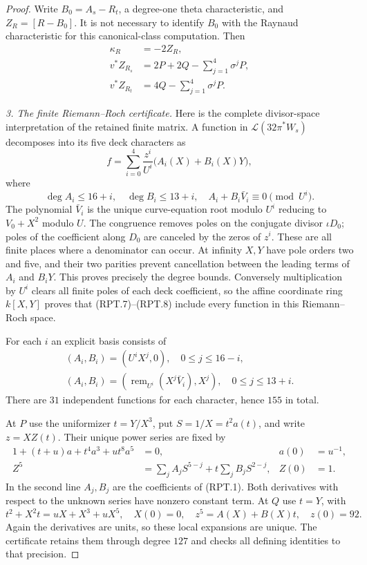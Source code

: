 \documentclass[11pt,a4paper]{article}
\begin{document}
\begin{proof}
Write $B_0=A_s-R_t$, a degree-one theta characteristic, and
$Z_R=[R-B_0]$. It is not necessary to identify $B_0$ with the
Raynaud characteristic for this canonical-class computation.
Then
\[
 \begin{aligned}
 \kappa_R&=-2Z_R,\\
 v^*Z_{R_s}&=2P+2Q-\sum_{j=1}^4\sigma^jP,\\
 v^*Z_{R_t}&=4Q-\sum_{j=1}^4\sigma^jP.
 \end{aligned}
 \tag{RPT.6}
\]

\emph{3. The finite Riemann--Roch certificate.}
Here is the complete divisor-space interpretation of the
retained finite matrix. A function in
$\mathcal L(32\pi^*W_s)$ decomposes into its five deck
characters as
\[
           f=\sum_{i=0}^4\frac{z^i}{U^i}
                              \bigl(A_i(X)+B_i(X)Y\bigr),
 \tag{RPT.7}
\]
where
\[
 \deg A_i\le16+i,\quad \deg B_i\le13+i,\quad
 A_i+B_i\bar V_i\equiv0\pmod{U^i}.
 \tag{RPT.8}
\]
The polynomial $\bar V_i$ is the unique curve-equation root
modulo $U^i$ reducing to $V_0+X^2$ modulo $U$.
The congruence removes poles on the conjugate divisor
$\iota D_0$; poles of the coefficient along $D_0$ are canceled
by the zeros of $z^i$. These are all finite places where a
denominator can occur. At infinity $X,Y$ have pole orders two
and five, and their two parities prevent cancellation between
the leading terms of $A_i$ and $B_iY$. This proves precisely
the degree bounds. Conversely multiplication by $U^i$ clears
all finite poles of each deck coefficient, so the affine
coordinate ring $k[X,Y]$ proves that (RPT.7)--(RPT.8) include
every function in this Riemann--Roch space.

For each $i$ an explicit basis consists of
\[
 \begin{gathered}
 (A_i,B_i)=(U^iX^j,0),\quad 0\le j\le16-i,\\
 (A_i,B_i)=
   (\operatorname{rem}_{U^i}(X^j\bar V_i),X^j),
                         \quad0\le j\le13+i.
 \end{gathered}
 \tag{RPT.9}
\]
There are $31$ independent functions for each character,
hence $155$ in total.

At $P$ use the uniformizer $t=Y/X^3$, put $S=1/X=t^2a(t)$,
and write $z=XZ(t)$. Their unique power series are fixed by
\[
 \begin{aligned}
 1+(t+u)a+t^4a^3+ut^8a^5&=0, & a(0)&=u^{-1},\\
 Z^5&=\sum_j A_jS^{5-j}
                   +t\sum_j B_jS^{2-j}, & Z(0)&=1.
 \end{aligned}
 \tag{RPT.10}
\]
In the second line $A_j,B_j$ are the coefficients of (RPT.1).
Both derivatives with respect to the unknown series have
nonzero constant term. At $Q$ use $t=Y$, with
\[
 t^2+X^2t=uX+X^3+uX^5,\quad X(0)=0,\quad
 z^5=A(X)+B(X)t,\quad z(0)=92.
 \tag{RPT.11}
\]
Again the derivatives are units, so these local expansions
are unique. The certificate retains them through degree
$127$ and checks all defining identities to that precision.


\end{proof}
\end{document}
